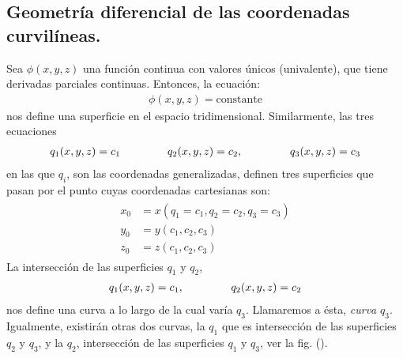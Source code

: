 \documentclass[12pt]{article}
\begin{document}
\subsection{Geometría diferencial de las coordenadas curvilíneas.}

Sea $\phi (x, y, z)$ una función continua con valores únicos (univalente), que tiene derivadas parciales continuas. Entonces, la ecuación:
\begin{align}
    \phi (x, y, z) = \text{constante}
    \label{eq:ecuacion_02_81}
\end{align} 
nos define una superficie en el espacio tridimensional. Similarmente, las tres ecuaciones 
\begin{align}
    q_{1} (x, y, z) = c_{1} \hspace{1.5cm} q_{2} (x, y, z) = c_{2}, \hspace{1.5cm} q_{3} (x, y, z) = c_{3}
    \label{eq:ecuacion_02_82}
\end{align}
en las que $q_{i}$, son las coordenadas generalizadas, definen tres superficies que pasan por el punto cuyas coordenadas cartesianas son:
\begin{align}
\begin{aligned}
x_{0} &= x \left( q_{1} = c_{1}, q_{2} = c_{2}, q_{3} = c_{3} \right) \\[0.5em]
y_{0} &= y \left( c_{1}, c_{2}, c_{3} \right) \\[0.5em]
z_{0} &= z \left( c_{1}, c_{2}, c_{3} \right)
\end{aligned}
\label{eq:ecuacion_02_83}
\end{align}
La intersección de las superficies $q_{1}$ y $q_{2}$, 
\begin{align*}
    q_{1} (x, y, z) = c_{1}, \hspace{1.5cm} q_{2} (x, y, z) = c_{2}
\end{align*}
nos define una curva a lo largo de la cual varía $q_{3}$. Llamaremos a ésta, \emph{curva} $q_{3}$. Igualmente, existirán otras dos curvas, la $q_{1}$ que es intersección de las superficies $q_{2}$ y $q_{3}$, y la $q_{2}$, intersección de las superficies $q_{1}$ y $q_{3}$, ver la fig. ().
\end{document}
